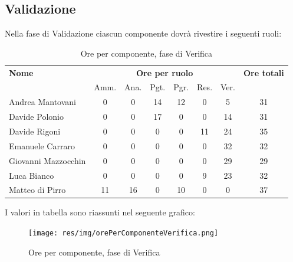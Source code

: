     
    
\pagebreak
\subsection{Validazione}
Nella fase di Validazione ciascun componente dovrà rivestire i seguenti ruoli:

\begin{table}[H]
\begin{tabular}{lccccccc}
\toprule
    \textbf{Nome}  & \multicolumn{6}{c}{\textbf{Ore per ruolo}} & \textbf{Ore totali} \\
     & Amm. & Ana. & Pgt. & Pgr. & Res. & Ver. & \\
    \midrule
    
	   Andrea Mantovani & 0 & 0 & 14 & 12 & 0 & 5 & 31 \\
         Davide Polonio & 0 & 0 & 17 & 0 & 0 & 14 & 31 \\
       	  Davide Rigoni & 0 & 0 & 0 & 0 & 11 & 24 & 35 \\
	   Emanuele Carraro & 0 & 0 & 0 & 0 & 0 & 32 & 32 \\
	Giovanni Mazzocchin & 0 & 0 & 0 & 0 & 0 & 29 & 29 \\
	        Luca Bianco & 0 & 0 & 0 & 0 & 9 & 23 & 32 \\
      	Matteo di Pirro & 11 & 16 & 0 & 10 & 0 & 0 & 37 \\
    
    \bottomrule
\end{tabular}
\caption{Ore per componente, fase di Verifica}
\end{table}

I valori in tabella sono riassunti nel seguente grafico: \\ 

    \begin{figure}[H]
      \begin{center}
        \texttt{[image: res/img/orePerComponenteVerifica.png]}
      \caption{Ore per componente, fase di Verifica}
      \end{center} 
    \end{figure}    
   
